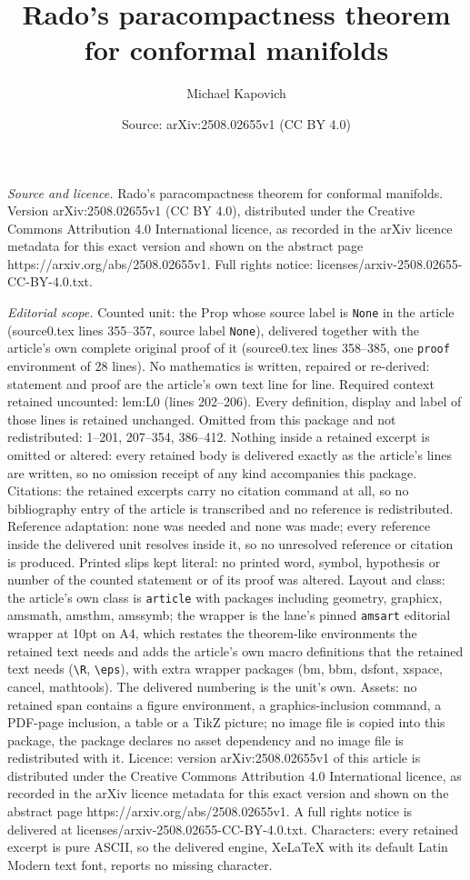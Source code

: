 \documentclass[10pt,a4paper]{amsart}
\title[Rado's paracompactness theorem for conformal manifolds]{Rado's paracompactness theorem for conformal manifolds}
\author{Michael Kapovich}
\date{Source: arXiv:2508.02655v1 (CC BY 4.0)}
\begin{document}
\maketitle

\noindent\emph{Source and licence.} Rado's paracompactness theorem for conformal manifolds. Version arXiv:2508.02655v1 (CC BY 4.0), distributed under the Creative Commons Attribution 4.0 International licence, as recorded in the arXiv licence metadata for this exact version and shown on the abstract page https://arxiv.org/abs/2508.02655v1. Full rights notice: licenses/arxiv-2508.02655-CC-BY-4.0.txt.\par\smallskip

\noindent\textit{Editorial scope.} Counted unit: the Prop whose source label is \texttt{None} in the article (source0.tex lines 355--357, source label \texttt{None}), delivered together with the article's own complete original proof of it (source0.tex lines 358--385, one \texttt{proof} environment of 28 lines). No mathematics is written, repaired or re-derived: statement and proof are the article's own text line for line. Required context retained uncounted: lem:L0 (lines 202--206). Every definition, display and label of those lines is retained unchanged. Omitted from this package and not redistributed: 1--201, 207--354, 386--412. Nothing inside a retained excerpt is omitted or altered: every retained body is delivered exactly as the article's lines are written, so no omission receipt of any kind accompanies this package. Citations: the retained excerpts carry no citation command at all, so no bibliography entry of the article is transcribed and no reference is redistributed. Reference adaptation: none was needed and none was made; every reference inside the delivered unit resolves inside it, so no unresolved reference or citation is produced. Printed slips kept literal: no printed word, symbol, hypothesis or number of the counted statement or of its proof was altered. Layout and class: the article's own class is \texttt{article} with packages including geometry, graphicx, amsmath, amsthm, amssymb; the wrapper is the lane's pinned \texttt{amsart} editorial wrapper at 10pt on A4, which restates the theorem-like environments the retained text needs and adds the article's own macro definitions that the retained text needs (\texttt{\textbackslash R}, \texttt{\textbackslash eps}), with extra wrapper packages (bm, bbm, dsfont, xspace, cancel, mathtools). The delivered numbering is the unit's own. Assets: no retained span contains a figure environment, a graphics-inclusion command, a PDF-page inclusion, a table or a TikZ picture; no image file is copied into this package, the package declares no asset dependency and no image file is redistributed with it. Licence: version arXiv:2508.02655v1 of this article is distributed under the Creative Commons Attribution 4.0 International licence, as recorded in the arXiv licence metadata for this exact version and shown on the abstract page https://arxiv.org/abs/2508.02655v1. A full rights notice is delivered at licenses/arxiv-2508.02655-CC-BY-4.0.txt. Characters: every retained excerpt is pure ASCII, so the delivered engine, XeLaTeX with its default Latin Modern text font, reports no missing character.
\end{document}
